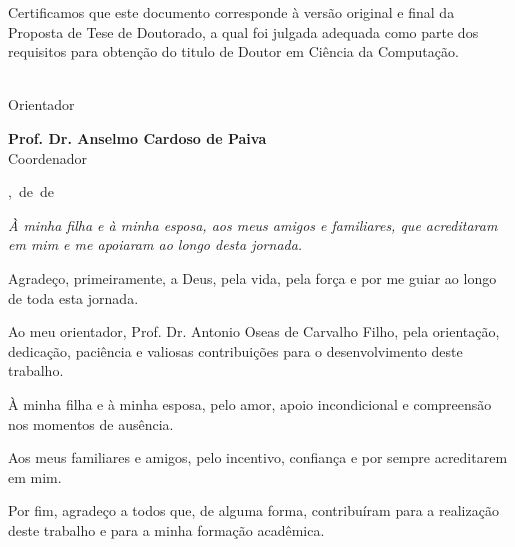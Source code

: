 \documentclass[
12pt,				%
oneside,			%
a4paper,			%
english,			%
french,				%
spanish,			%
brazil				%
]{abntex2}
\newcommand{\alinhadoesq}[1]{\noindent\begin{minipage}[top]{\textwidth}#1\end{minipage}}
\newcommand{\alinhadodir}[1]{\alinhadoesq{\begin{flushright}#1\end{flushright}}}
\newcommand{\myyear}{}
\newcommand{\mymonth}{}
\newcommand{\myday}{}
\begin{document}
\begin{folhadeaprovacao}
			\vspace{0.03\textwidth} 
			
			\hspace{.15\textwidth}
			\begin{minipage}{.75\textwidth}
				Certificamos que este documento corresponde à versão original e final da Proposta de Tese de Doutorado, a qual foi julgada adequada como parte dos requisitos para obtenção do titulo de Doutor em Ciência da Computação.
				
			\end{minipage} 
			
			\vspace*{\fill} 
			
			\alinhadodir{ \textbf{\imprimirorientador} \\ Orientador }
			\vspace*{\fill} 
			
			\alinhadodir{\textbf{Prof. Dr. Anselmo Cardoso de Paiva} \\ Coordenador }
			
			\vspace*{\fill} 
			
			\alinhadodir{\imprimirlocal, \myday\,de \mymonth\,de \myyear}
			
		\end{folhadeaprovacao}
		
		
		\begin{dedicatoria}
			\vspace*{\fill}
			\begin{flushright}
				\textit{À minha filha e à minha esposa, aos meus amigos e familiares, que acreditaram em mim e me apoiaram ao longo desta jornada.}
			\end{flushright}
			\vspace{2,5cm}
		\end{dedicatoria}%
		
		
		
		\begin{agradecimentos}
			Agradeço, primeiramente, a Deus, pela vida, pela força e por me guiar ao longo de toda esta jornada.
			
			Ao meu orientador, Prof. Dr. Antonio Oseas de Carvalho Filho, pela orientação, dedicação, paciência e valiosas contribuições para o desenvolvimento deste trabalho.
			
			À minha filha e à minha esposa, pelo amor, apoio incondicional e compreensão nos momentos de ausência.
			
			Aos meus familiares e amigos, pelo incentivo, confiança e por sempre acreditarem em mim.
			
			Por fim, agradeço a todos que, de alguma forma, contribuíram para a realização deste trabalho e para a minha formação acadêmica.
		\end{agradecimentos}
		
\end{document}
